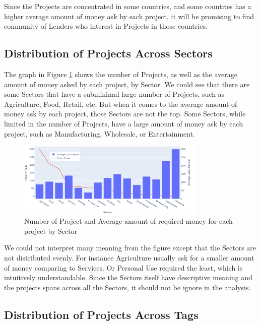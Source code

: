 Since the Projects are concentrated in some countries,
and some countries has a higher average amount of money ask by each project,
it will be promising to find community of Lenders who interest in Projects in those countries.


\subsection{Distribution of Projects Across Sectors}

The graph in Figure \ref{fig:project-vs-sector} shows the number of Projects,
as well as the average amount of money asked by each project, by Sector.
We could see that there are some Sectors that have a subminimal large number of Projects, such as Agriculture, Food, Retail, etc.
But when it comes to the average amount of money ask by each project, those Sectors are not the top.
Some Sectors, while limited in the number of Projects, have a large amount of money ask by each project, such as Manufacturing, Wholesale, or Entertainment.

\begin{figure}[H]
	\centering
	\includegraphics[width=0.8\textwidth]{images/project-vs-sector.pdf}
	\caption[Number of Project and Average amount of required money for each project by Sector]{
		Number of Project and Average amount of required money for each project by Sector
	}
	\label{fig:project-vs-sector}
\end{figure}

We could not interpret many meaning from the figure
except that the Sectors are not distributed evenly.
For instance Agriculture usually ask for a smaller amount of money comparing to Services.
Or Personal Use required the least, which is intuitively understandable.
Since the Sectors itself have descriptive meaning and the projects spans across all the Sectors,
it should not be ignore in the analysis.

\subsection{Distribution of Projects Across Tags}


